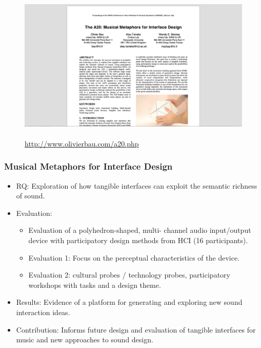 \documentclass[screen, aspectratio=169]{beamer}
\begin{document}
%
\begin{frame}
\frametitle{}	
\begin{figure}
	\includegraphics[scale=0.29]{img/Bau-et-al-2008.png}\\
	    \cite{Bau.et.al.2008.NIME}\\
	       {\scriptsize  \url{http://www.olivierbau.com/a20.php}}
    \end{figure}	
\end{frame}
%
\begin{frame}
\frametitle{Musical Metaphors for Interface Design}	
\begin{itemize}
\item RQ: Exploration of how tangible interfaces can exploit the semantic richness of sound.
\item Evaluation:
\begin{itemize}
\item Evaluation of a polyhedron-shaped, multi- channel audio input/output device with participatory design methods from HCI (16 participants).
\item Evaluation 1: Focus on the perceptual characteristics of the device.
\item Evaluation 2: cultural probes / technology probes, participatory workshops with tasks and a design theme.
\end{itemize}
\item Results: Evidence of a platform for generating and exploring new sound interaction ideas.
\item Contribution: Informs future design and evaluation of tangible interfaces for music and new approaches to sound design.
\end{itemize}
\end{frame}
%
\end{document}
